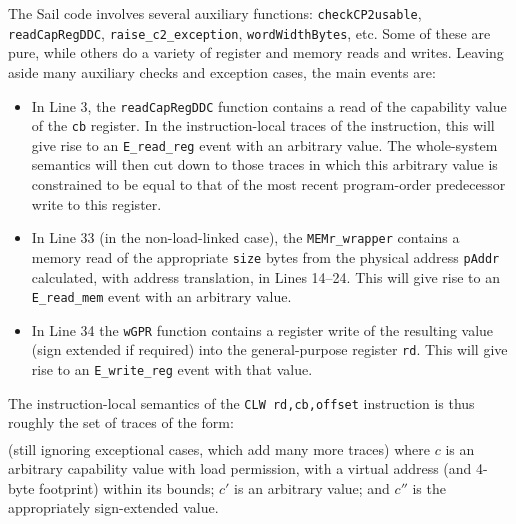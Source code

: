\documentclass[11pt]{article}
\theoremstyle{definition}
\begin{document}
The Sail code involves several auxiliary functions: \lstinline{checkCP2usable}, 
\lstinline{readCapRegDDC}, 
\lstinline{raise_c2_exception}, 
\lstinline{wordWidthBytes}, etc.
Some of these are pure, while others do a variety of register and
memory reads and writes.
Leaving aside many auxiliary checks and exception cases, the main
events are:
\begin{itemize}
  \item In Line 3, the \lstinline{readCapRegDDC} function contains a
    read of the capability value of the
\lstinline{cb} register.
In the instruction-local traces of the instruction, this will give rise to an \texttt{E\_read\_reg} event with an
arbitrary value.
The whole-system semantics will then cut down to those traces in which this
arbitrary value is constrained to be equal to that of the most recent
program-order predecessor write to this register. 


\item In Line 33 (in the non-load-linked case), the
  \lstinline{MEMr_wrapper} contains a memory read of the appropriate
  \lstinline{size} bytes from the physical address \lstinline{pAddr}
  calculated, with address translation, in Lines 14--24.
This will give rise to an \texttt{E\_read\_mem} event with an
arbitrary value.
  
\item In Line 34 the \lstinline{wGPR} function contains a register
  write of the resulting value (sign extended if required) into the
  general-purpose register \lstinline{rd}.
  This will give rise to an \texttt{E\_write\_reg} event with that
  value. 
  \end{itemize}


The instruction-local semantics of the \lstinline{CLW rd,cb,offset}
instruction is thus roughly the set of traces of the form:
\begin{align*}
	[ \texttt{E\_read\_reg}(\texttt{cb}, c),\
          \texttt{E\_read\_mem}(\texttt{Read\_plain}, \mathit{addr},
          4, c'),\ \texttt{E\_write\_reg}(\texttt{rd}, c'') ]
\end{align*}
(still ignoring exceptional cases, which add many more traces) where $c$ is an arbitrary capability value 
with load permission, with a virtual address (and 4-byte footprint)
within its bounds; $c'$ is an arbitrary value; and $c''$ is the
appropriately sign-extended value. 
\end{document}
